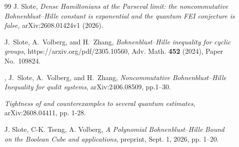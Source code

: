 \documentclass[11pt]{article}
\theoremstyle{definition}
\theoremstyle{remark}
\begin{document}
\begin{thebibliography}{99}
J. Slote, 
\emph{Dense Hamiltonians at the Parseval limit: the noncommutative Bohnenblust–Hille constant is
exponential and the quantum FEI conjecture is false,}
arXiv:2608.01424v1 (2026).

J.~Slote, A.~Volberg, and H.~Zhang,
\emph{Bohnenblust--Hille inequality for cyclic groups},
https://arxiv.org/pdf/2305.10560, Adv. Math. \textbf{452} (2024), Paper No.~109824.

,
J.~Slote, A.~Volberg, and H.~Zhang,
\emph{Noncommutative Bohnenblust--Hille Inequality for qudit systems},
arXiv:2406.08509, pp.1--30.


\emph{Tightness of and counterexamples to several quantum estimates},
arXiv:2608.04411, pp. 1-28.


J. Slote, C-K. Tseng, A. Volberg,
\emph{A Polynomial Bohnenblust--Hille Bound\\on the Boolean Cube and applications},
preprint, Sept. 1, 2026, pp. 1--20.


\end{thebibliography}
\end{document}
